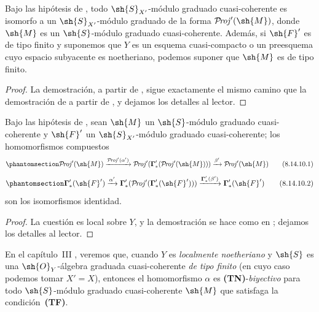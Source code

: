 \documentclass[oneside,10pt]{amsart}
\def\shProj{\mathcal{P}\!\mathit{roj}}
\newcommand{\oldpage}[2][]{\marginnote{\normalfont\footnotesize\textbf{#1}~|~#2}\ignorespaces}
\let\EGAOriginalLabel\label
\renewcommand{\label}[1]{\phantomsection\EGAOriginalLabel{#1}}
\begin{document}
\begin{corollary}[8.14.9]
\label{II.8.14.9}
Bajo las hipótesis de \textup{}, todo $\sh{S}_{X'}$-módulo graduado cuasi-coherente es isomorfo a un $\sh{S}_{X'}$-módulo graduado de la forma $\shProj'(\sh{M})$, donde $\sh{M}$ es un $\sh{S}$-módulo graduado cuasi-coherente.
Además, si $\sh{F}'$ es de tipo finito y suponemos que $Y$ es un esquema cuasi-compacto o un preesquema cuyo espacio subyacente es noetheriano, podemos suponer que $\sh{M}$ es de tipo finito.
\end{corollary}

\begin{proof}
La demostración, a partir de , sigue exactamente el mismo camino que la demostración de  a partir de , y dejamos los detalles al lector.
\end{proof}

\begin{proposition}[8.14.10]
\label{II.8.14.10}
Bajo las hipótesis de \textup{}, sean $\sh{M}$ un $\sh{S}$-módulo graduado cuasi-coherente y $\sh{F}'$ un $\sh{S}_{X'}$-módulo graduado cuasi-coherente;
los homomorfismos compuestos
\[
\label{II.8.14.10.1}
    \shProj'(\sh{M})
    \xrightarrow{\shProj'(\alpha')}
    \shProj'(\boldsymbol{\Gamma}'_*(\shProj'(\sh{M})))
    \xrightarrow{\beta'}
    \shProj'(\sh{M})
\tag{8.14.10.1}
\]
\[
\label{II.8.14.10.2}
    \boldsymbol{\Gamma}'_*(\sh{F}')
    \xrightarrow{\alpha'}
    \boldsymbol{\Gamma}'_*(\shProj'(\boldsymbol{\Gamma}'_*(\sh{F}')))
    \xrightarrow{\boldsymbol{\Gamma}'_*(\beta')}
    \boldsymbol{\Gamma}'_*(\sh{F}')
\tag{8.14.10.2}
\]
son los isomorfismos identidad.
\end{proposition}

\begin{proof}
La cuestión es local sobre $Y$, y la demostración se hace como en ;
dejamos los detalles al lector.
\end{proof}

\begin{remark}[8.14.11]
\label{II.8.14.11}
En el capítulo~III , veremos que, cuando $Y$ es \emph{localmente noetheriano} y $\sh{S}$ es una $\sh{O}_Y$-álgebra graduada cuasi-coherente \emph{de tipo finito} (en cuyo caso
\oldpage[II]{201}
podemos tomar $X'=X$), entonces el homomorfismo $\alpha$  es \textbf{(TN)}-\emph{biyectivo} para todo $\sh{S}$-módulo graduado cuasi-coherente $\sh{M}$ que satisfaga la condición~\textbf{(TF)}.
\end{remark}
\end{document}
